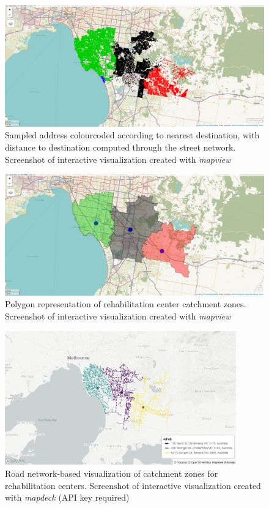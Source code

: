 \documentclass[utf8]{frontiersHLTH}
\begin{document}
\begin{figure}[h!]
\begin{center}
\includegraphics[width=15cm]{map4_mv.png}
\end{center}
\caption{Sampled address colourcoded according to nearest destination, with distance to destination computed through the street network. Screenshot of interactive visualization created with {\em mapview}}\label{fig:RehabCenterAddressCatchments}
\end{figure}

\begin{figure}[h!]
\begin{center}
\includegraphics[width=15cm]{map5_mv.png}
\end{center}
\caption{Polygon representation of rehabilitation center catchment zones. Screenshot of interactive visualization created with {\em mapview}}\label{fig:RehabCenterPolyCatchments}
\end{figure}

\begin{figure}[h!]
\begin{center}
\includegraphics[width=10cm]{nearest_rehab.png}
\end{center}
\caption{Road network-based visualization of catchment zones for rehabilitation centers. Screenshot of interactive visualization created with {\em mapdeck} (API key required)}\label{fig:RehabCenterRoadCatchment}
\end{figure}
\end{document}
